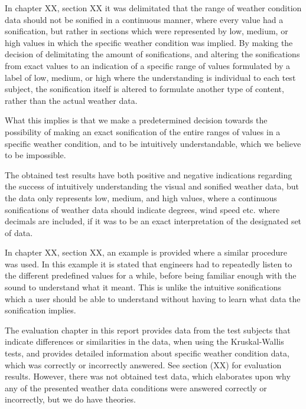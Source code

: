 In chapter XX, section XX it was delimitated that the range of weather condition data should not be sonified in a continuous manner, where every value had a sonification, but rather in sections which were represented by low, medium, or high values in which the specific weather condition was implied. 
By making the decision of delimitating the amount of sonifications, and altering the sonifications from exact values to an indication of a specific range of values formulated by a label of low, medium, or high where the understanding is individual to each test subject, the sonification itself is altered to formulate another type of content, rather than the actual weather data. 

What this implies is that we make a predetermined decision towards the possibility of making an exact sonification of the entire ranges of values in a specific weather condition, and to be intuitively understandable, which we believe to be impossible.

The obtained test results have both positive and negative indications regarding the success of intuitively understanding the visual and sonified weather data, but the data only represents low, medium, and high values, where a continuous sonifications of weather data should indicate degrees, wind speed etc. where decimals are included, if it was to be an exact interpretation of the designated set of data. 

In chapter XX, section XX, an example is provided where a similar procedure was used. In this example it is stated that engineers had to repeatedly listen to the different predefined values for a while, before being familiar enough with the sound to understand what it meant. This is unlike the intuitive sonifications which a user should be able to understand without having to learn what data the sonification implies.

The evaluation chapter in this report provides data from the test subjects that indicate differences or similarities in the data, when using the Kruskal-Wallis tests, and provides detailed information about specific weather condition data, which was correctly or incorrectly answered. See section (XX) for evaluation results. However, there was not obtained test data, which elaborates upon why any of the presented weather data conditions were answered correctly or incorrectly, but we do have theories.


